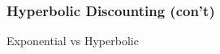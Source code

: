 \documentclass[final]{beamer}
\begin{document}
%
\begin{frame}\frametitle{Hyperbolic Discounting (con't)}\vspace{-1em}
\begin{center}
Exponential vs Hyperbolic\\[1em]
\end{center}
\hspace{-1em}
\end{frame}
%
\end{document}
